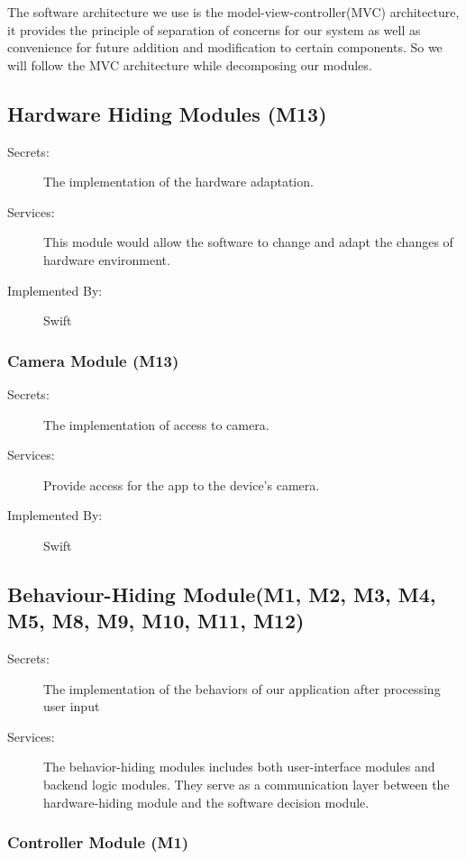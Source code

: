 \documentclass[12pt, titlepage]{article}
\begin{document}
The software architecture we use is the model-view-controller(MVC) architecture, it provides the principle of separation of concerns for our system as well as convenience for future addition and modification to certain components.
So we will follow the MVC architecture while decomposing our modules.


\subsection{Hardware Hiding Modules (M13)}

\begin{description}
\item[Secrets:]The implementation of the hardware adaptation.
\item[Services:]This module would allow the software to change and adapt the changes of hardware environment.
\item[Implemented By:] Swift
\end{description}

\subsubsection{Camera Module (M13)}

\begin{description}
\item[Secrets:]The implementation of access to camera.
\item[Services:]Provide access for the app to the device's camera.
\item[Implemented By:] Swift
\end{description}

\subsection{Behaviour-Hiding Module(M1, M2, M3, M4, M5, M8, M9, M10, M11, M12)}

\begin{description}
\item[Secrets:]The implementation of the behaviors of our application after processing user input
\item[Services:] The behavior-hiding modules includes both user-interface modules and backend logic modules. They serve as a communication layer between the
  hardware-hiding module and the software decision module.
\end{description}

\subsubsection{Controller Module (M1)}
\end{document}
